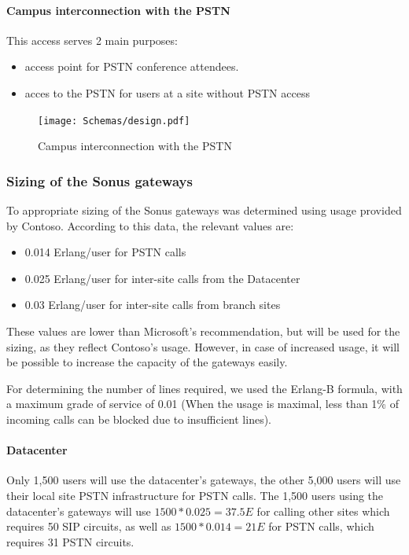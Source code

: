 	
	\paragraph{Campus interconnection with the PSTN}
	This access serves 2 main purposes:
	\begin{itemize}
		\item access point for PSTN conference attendees.
		\item acces to the PSTN for users at a site without PSTN access
	\end{itemize}
		
	\begin{figure}[H]
		\centering
		\texttt{[image: Schemas/design.pdf]}
		\caption{Campus interconnection with the PSTN}
		\label{fig:case_pstn_campus}
	\end{figure}

	
\subsubsection{Sizing of the Sonus gateways}
	To appropriate sizing of the Sonus gateways was determined using usage provided by Contoso. According to this data, the relevant values are: 
	\begin{itemize}
		\item 0.014 Erlang/user for PSTN calls
		\item 0.025 Erlang/user for inter-site calls from the Datacenter
		\item 0.03 Erlang/user for inter-site calls from branch sites
	\end{itemize}
	These values are lower than Microsoft's recommendation, but will be used for the sizing, as they reflect Contoso's usage. However, in case of increased usage, it will be possible to increase the capacity of the gateways easily.
	
	For determining the number of lines required, we used the Erlang-B formula, with a maximum grade of service of 0.01 (When the usage is maximal, less than 1\% of incoming calls can be blocked due to insufficient lines)\cite{qiao_robust_1998}.
	
	
	\paragraph{Datacenter}
	Only 1,500 users will use the datacenter's gateways, the other 5,000 users will use their local site PSTN infrastructure for PSTN calls. The 1,500 users using the datacenter's gateways will use $1500*0.025 = 37.5 E$ for calling other sites which requires 50 SIP circuits, as well as $1500*0.014 = 21 E$ for PSTN calls, which requires 31 PSTN circuits.
	
